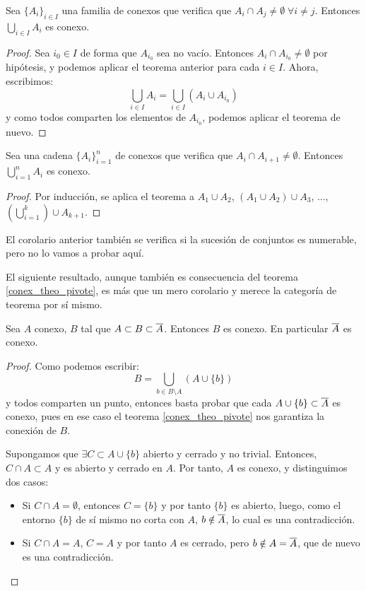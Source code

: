 \begin{cor}
	Sea $\{A_i\}_{i\in I}$ una familia de conexos que verifica que $A_i\cap A_j\neq\emptyset\;\forall i\neq j$. Entonces $\bigcup_{i\in I} A_i$ es conexo.
	
	\begin{proof}
		Sea $i_0\in I$ de forma que $A_{i_0}$ sea no vacío. Entonces $A_i\cap A_{i_0}\neq\emptyset$ por hipótesis, y podemos aplicar el teorema anterior para cada $i\in I$. Ahora, escribimos:
		\[\bigcup_{i\in I} A_i = \bigcup_{i\in I} (A_i\cup A_{i_0})\]
		y como todos comparten los elementos de $A_{i_0}$, podemos aplicar el teorema de nuevo.
	\end{proof}
\end{cor}

\begin{cor}
	Sea una cadena $\{A_i\}_{i=1}^n$ de conexos que verifica que $A_i\cap A_{i+1}\neq\emptyset$. Entonces $\bigcup_{i=1}^n A_i$ es conexo.
	
	\begin{proof}
		Por inducción, se aplica el teorema a $A_1\cup A_2$, $(A_1\cup A_2)\cup A_3$, ..., $\left(\bigcup_{i=1}^k\right)\cup A_{k+1}$.
	\end{proof}
\end{cor}

\begin{obs}
	El corolario anterior también se verifica si la sucesión de conjuntos es numerable, pero no lo vamos a probar aquí.
\end{obs}

El siguiente resultado, aunque también es consecuencia del teorema \ref{conex_theo_pivote}, es más que un mero corolario y merece la categoría de teorema por sí mismo.

\begin{theo}
	Sea $A$ conexo, $B$ tal que $A\subset B\subset\overline{A}$. Entonces $B$ es conexo. En particular $\overline{A}$ es conexo.
	
	\begin{proof}
		Como podemos escribir:
		\[B=\bigcup_{b\in B\setminus A} (A\cup\{b\}) \]
		y todos comparten un punto, entonces basta probar que cada $A\cup\{b\}\subset\overline{A}$ es conexo, pues en ese caso el teorema \ref{conex_theo_pivote} nos garantiza la conexión de $B$.
		
		Supongamos que $\exists C\subset A\cup\{b\}$ abierto y cerrado y no trivial. Entonces, $C\cap A\subset A$ y es abierto y cerrado en $A$. Por tanto, $A$ es conexo, y distinguimos dos casos:
		
		\begin{itemize}
			\item Si $C\cap A=\emptyset$, entonces $C=\{b\}$ y por tanto $\{b\}$ es abierto, luego, como el entorno $\{b\}$ de sí mismo no corta con $A$, $b\notin\overline{A}$, lo cual es una contradicción.
			\item Si $C\cap A=A$, $C=A$ y por tanto $A$ es cerrado, pero $b\notin A=\overline{A}$, que de nuevo es una contradicción. \qedhere
		\end{itemize}
	\end{proof}
\end{theo}